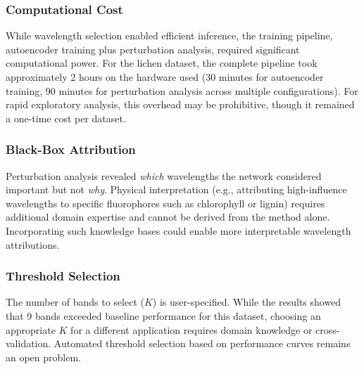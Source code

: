 
\subsubsection{Computational Cost}
While wavelength selection enabled efficient inference, the training pipeline, autoencoder training plus perturbation analysis, required significant computational power.
For the lichen dataset, the complete pipeline took approximately 2 hours on the hardware used (30 minutes for autoencoder training, 90 minutes for perturbation analysis across multiple configurations).
For rapid exploratory analysis, this overhead may be prohibitive, though it remained a one-time cost per dataset.

\subsubsection{Black-Box Attribution}
Perturbation analysis revealed \emph{which} wavelengths the network considered important but not \emph{why}.
Physical interpretation (e.g., attributing high-influence wavelengths to specific fluorophores such as chlorophyll or lignin) requires additional domain expertise \cite{meysurova2021optical} and cannot be derived from the method alone.
Incorporating such knowledge bases could enable more interpretable wavelength attributions.

\subsubsection{Threshold Selection}
The number of bands to select ($K$) is user-specified.
While the results showed that 9 bands exceeded baseline performance for this dataset, choosing an appropriate $K$ for a different application requires domain knowledge or cross-validation.
Automated threshold selection based on performance curves remains an open problem.

